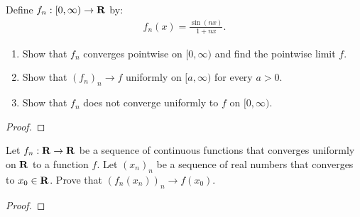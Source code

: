 \documentclass[11pt,twoside,openany]{memoir}
\begin{document}
\newpage
\fancyhead[L]{\scalebox{0.9}{Continuity}}
\fancyhead[R]{\scalebox{0.9}{Appeared on: F16}}
\begin{problem}
    Define $f_n: [0,\infty) \rightarrow \mathbf{R}$ by:
        \begin{equation*}
        \begin{split}
            f_n(x) = \frac{\sin(nx)}{1 + nx}.
        \end{split}
        \end{equation*}
    \begin{enumerate}[label = (\arabic*)]
        \item Show that $f_n$ converges pointwise on $[0,\infty)$ and find the pointwise limit $f$.
        \item Show that $(f_n)_n \rightarrow f$ uniformly on $[a,\infty)$ for every $a > 0$.
        \item Show that $f_n$ does not converge uniformly to $f$ on $[0,\infty)$.
    \end{enumerate}
\end{problem}
\begin{proof}
\end{proof}

\newpage
\fancyhead[L]{\scalebox{0.9}{Continuity}}
\fancyhead[R]{\scalebox{0.9}{Appeared on: S16}}
\begin{problem}
    Let $f_n:\mathbf{R} \rightarrow \mathbf{R}$ be a sequence of continuous functions that converges uniformly on $\mathbf{R}$ to a function $f$. Let $(x_n)_n$ be a sequence of real numbers that converges to $x_0 \in \mathbf{R}$. Prove that $(f_n(x_n))_n \rightarrow f(x_0)$.
\end{problem}
\begin{proof}
\end{proof}
\end{document}
